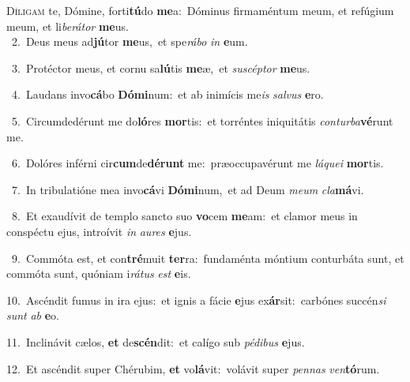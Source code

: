 \lettrine{\initial\textcolor{\initialcolor}{D}}{íligam} te, Dómine, forti\-\textbf{tú}\-do \textbf{me}\-a:~\star Dóminus firmaméntum meum, et refúgium meum, et li\-\textit{be}\-\textit{rá}\textit{tor} \textbf{me}\-us.\\
{\numbfont\textcolor{\numbcolor}{~2.}}~Deus meus ad\-\textbf{jú}\-tor \textbf{me}\-us,~\star et spe\-\textit{rá}\-\textit{bo} \textit{in} \textbf{e}\-um.\par
{\numbfont\textcolor{\numbcolor}{~3.}}~Protéctor meus, et cornu sa\-\textbf{lú}\-tis \textbf{me}\-æ,~\star et \textit{su}\-\textit{scép}\textit{tor} \textbf{me}\-us.\par
{\numbfont\textcolor{\numbcolor}{~4.}}~Laudans invo\-\textbf{cá}\-bo \textbf{Dó}\-\textbf{mi}num:~\star et ab inimícis me\textit{is} \textit{sal}\-\textit{vus} \textbf{e}\-ro.\par
{\numbfont\textcolor{\numbcolor}{~5.}}~Circumdedérunt me do\-\textbf{ló}\-res \textbf{mor}\-tis:~\star et torréntes iniquitátis \textit{con}\-\textit{tur}\textit{ba}\textbf{vé}runt me.\par
{\numbfont\textcolor{\numbcolor}{~6.}}~Dolóres inférni cir\-\textbf{cum}\-de\-\textbf{dé}\-\textbf{runt} me:~\star præoccupavérunt me \textit{lá}\-\textit{que}\textit{i} \textbf{mor}\-tis.\par
{\numbfont\textcolor{\numbcolor}{~7.}}~In tribulatióne mea invo\-\textbf{cá}\-vi \textbf{Dó}\-\textbf{mi}num,~\star et ad Deum \textit{me}\-\textit{um} \textit{cla}\-\textbf{má}vi.\par
{\numbfont\textcolor{\numbcolor}{~8.}}~Et exaudívit de templo sancto suo \textbf{vo}\-cem \textbf{me}\-am:~\star et clamor meus in conspéctu ejus, introívit \textit{in} \textit{au}\-\textit{res} \textbf{e}\-jus.\par
{\numbfont\textcolor{\numbcolor}{~9.}}~Commóta est, et con\-\textbf{tré}\-muit \textbf{ter}\-ra:~\star fundaménta móntium conturbáta sunt, et commóta sunt, quóniam i\-\textit{rá}\-\textit{tus} \textit{est} \textbf{e}\-is.\par
{\numbfont\textcolor{\numbcolor}{10.}}~Ascéndit fumus in ira ejus:~\dagger et ignis a fácie \textbf{e}\-jus ex\-\textbf{ár}\-sit:~\star carbónes succén\textit{si} \textit{sunt} \textit{ab} \textbf{e}\-o.\par
{\numbfont\textcolor{\numbcolor}{11.}}~Inclinávit cælos, \textbf{et} de\-\textbf{scén}\-dit:~\star et calígo sub \textit{pé}\-\textit{di}\textit{bus} \textbf{e}\-jus.\par
{\numbfont\textcolor{\numbcolor}{12.}}~Et ascéndit super Chérubim, \textbf{et} vo\-\textbf{lá}\-vit:~\star volávit super \textit{pen}\-\textit{nas} \textit{ven}\-\textbf{tó}rum.\par
